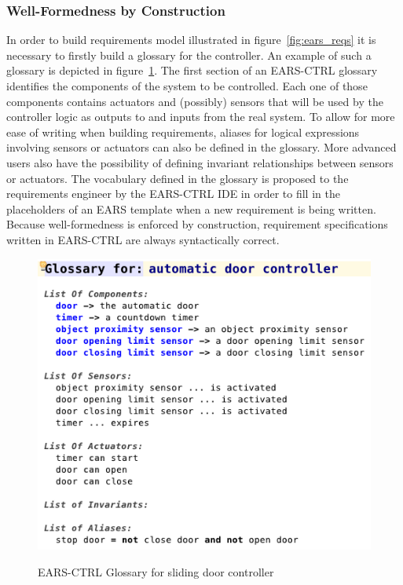 \subsubsection{Well-Formedness by Construction}
\vspace{-0cm}In order to build requirements model illustrated in
figure~\ref{fig:ears_reqs} it is necessary to firstly build a glossary
for the controller. An example of such a glossary is depicted in
figure~\ref{fig:ears_glossary}. The first section of an \textsf{EARS-CTRL}
glossary identifies the components of the system to be controlled. Each one of
those components contains actuators and (possibly) sensors that will be used by
the controller logic as outputs to and inputs from the real system. To allow
for more ease of writing when building requirements, aliases for logical expressions
involving sensors or actuators can also be defined in the glossary. More
advanced users also have the possibility of defining invariant relationships
between sensors or actuators.
The vocabulary defined in the glossary is proposed to the requirements engineer
by the \textsf{EARS-CTRL} IDE in order to fill in the placeholders of an EARS
template when a new requirement is being written. Because well-formedness is
enforced by construction, requirement specifications written in
\textsf{EARS-CTRL} are always syntactically correct.\vspace{-.6cm}
\begin{figure}[h!]
   \begin{center}
     \includegraphics[width=.5\textwidth]{images/glossary.png}
     \caption{\textsf{EARS-CTRL} Glossary for sliding door
     controller}
     \vspace{-.3cm}
     \label{fig:ears_glossary}
   \end{center}
   \vspace{-1.4cm}
 \end{figure} 
